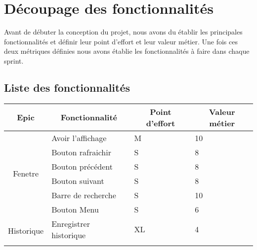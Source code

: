 \documentclass[10pt,a4paper]{article}
\begin{document}
\newpage

\section{Découpage des fonctionnalités}
Avant de débuter la conception du projet, nous avons du établir les principales fonctionnalités et définir leur point d'effort et leur valeur métier. Une fois ces deux métriques définies nous avons établie les fonctionnalités à faire dans chaque sprint. 

\subsection{Liste des fonctionnalités}
\begin{table}[H]
\begin{tabular}{|c|l|l|l|}
\hline
\textbf{Epic}                           & \multicolumn{1}{c|}{\textbf{Fonctionnalité}} & \multicolumn{1}{c|}{\textbf{Point d'effort}} & \multicolumn{1}{c|}{\textbf{Valeur métier}} \\ \hline
\multirow{6}{*}{Fenetre}                & Avoir l'affichage                            & M                                            & 10                                          \\ \cline{2-4} 
                                        & Bouton rafraichir                            & S                                            & 8                                           \\ \cline{2-4} 
                                        & Bouton précédent                             & S                                            & 8                                           \\ \cline{2-4} 
                                        & Bouton suivant                               & S                                            & 8                                           \\ \cline{2-4} 
                                        & Barre de recherche                           & S                                            & 10                                          \\ \cline{2-4} 
                                        & Bouton Menu                                  & S                                            & 6                                           \\ \hline
\multirow{5}{*}{Historique}             & Enregistrer historique                       & XL                                           & 4                                           \\ \cline{2-4} 

\end{tabular}
\end{table}
\end{document}
